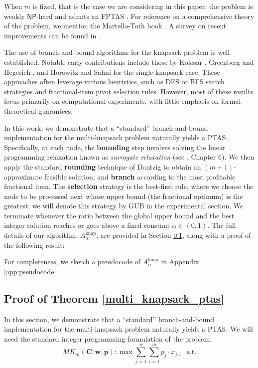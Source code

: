 \documentclass[a4paper,UKenglish,cleveref, autoref, thm-restate, pdfa]{lipics-v2021}
\theoremstyle{plain}
\begin{document}
When $m$ is fixed, that is the case we are considering in this paper, the problem is weakly $\mathsf{NP}$-hard and admits an FPTAS \cite{ibarra_kim,lawler_fptas}.
For reference on a comprehensive theory of the problem, we mention the Martello-Toth book \cite{martello_toth}. A survey on recent improvements can be found in \cite{survey,MastrolilliH06}. 

The use of branch-and-bound algorithms for the knapsack problem is well-established. Notable early contributions include those by Kolesar \cite{kolesar}, Greenberg and Hegerich \cite{greenberg_hegerich}, and Horowitz and Sahni \cite{horowitz_sahni_knapsack} for the single-knapsack case. These approaches often leverage various heuristics, such as DFS or BFS search strategies and fractional-item pivot selection rules. However, most of these results focus primarily on computational experiments, with little emphasis on formal theoretical guarantees.

In this work, we demonstrate that a ``standard'' branch-and-bound implementation for the multi-knapsack problem naturally yields a PTAS. Specifically, at each node, the \textbf{bounding} step involves solving the linear programming relaxation known as \emph{surrogate relaxation} (see \cite{martello_toth}, Chapter 6). 
We then apply the standard \textbf{rounding} technique of Dantzig \cite{dantzig} to obtain an $(m+1)$-approximate feasible solution, and \textbf{branch} according to the most profitable fractional item. The \textbf{selection} strategy is the best-first rule, where we choose the node to be processed next whose upper bound (the fractional optimum) is the greatest; we will denote this strategy by GUB in the experimental section. We terminate whenever the ratio between the global upper bound and the best integer solution reaches or goes above a fixed constant $\alpha\in (0,1)$. The full details of our algorithm, \( A^{\text{knap}}_{\alpha} \), are provided in Section \ref{sec:knap_proof}, along with a proof of the following result:

\mk

For completeness, we sketch a pseudocode of $A^{\text{knap}}_{\alpha}$ in Appendix \ref{app:pseudocode}.

\subsection{Proof of Theorem \ref{multi_knapsack_ptas}}\label{sec:knap_proof}

In this section, we demonstrate that a ``standard'' branch-and-bound implementation for the multi-knapsack problem naturally yields a PTAS. We will need the standard integer programming formulation of the problem:
\begin{equation}\label{knapsack_ip}
    MK_m(\bm{C}, \bm{w}, \bm{p}) : \max \sum\limits_{j=1}^n \sum\limits_{i = 1}^m p_j \cdot x_{j,i} \,\,\, \text{ s.t.}
\end{equation}
\end{document}
